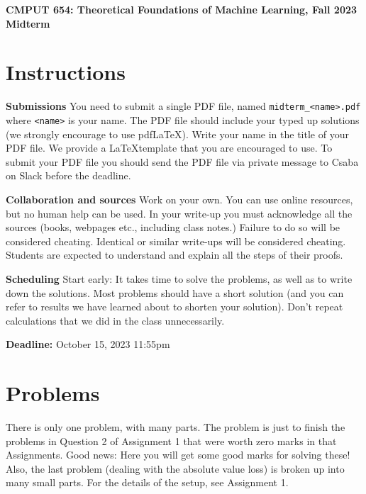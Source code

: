 \documentclass{article}
\DeclareMathOperator*{\1}{\mathbbm{1}}
\theoremstyle{definition}
\theoremstyle{remark}
\begin{document}
\begin{center}
{\Large \textbf{CMPUT 654: Theoretical Foundations of Machine Learning, Fall 2023\\ Midterm}}
\end{center}

\section*{Instructions}
\textbf{Submissions}
You need to submit a single PDF file, named {\tt midterm\_<name>.pdf} where {\tt <name>} is your name.
The PDF file should include your typed up solutions (we strongly encourage to use pdf\LaTeX). 
Write your name in the title of your PDF file.
We provide a \LaTeX template that you are encouraged to use.
To submit your PDF file you should send the PDF file via private message to Csaba on Slack before the deadline.


\textbf{Collaboration and sources}
Work on your own. You can use online resources, but no human help can be used.
In your write-up you must acknowledge all the
sources (books, webpages etc., including class notes.) 
Failure to do so will be considered cheating.  
Identical or similar write-ups will be considered cheating.
Students are expected to understand and explain all the steps of their proofs.

\textbf{Scheduling}
Start early: It takes time to solve the problems, as well as to write down the solutions. Most problems should have a short solution (and you can refer to results we have learned about to shorten your solution). Don't repeat calculations that we did in the class unnecessarily.

\vspace{0.3cm}

\textbf{Deadline:} October 15, 2023 11:55pm

\newcommand{\cM}{\mathcal{M}}
\newcommand{\nS}{\mathrm{S}}
\newcommand{\nA}{\mathrm{A}}
\newcommand{\PP}{\mathbb{P}}
\newcommand{\RR}{\mathbb{R}}
\newcommand{\cX}{\mathcal{X}}
\newcommand{\cY}{\mathcal{Y}}
\newcommand{\cZ}{\mathcal{Z}}
\newcommand{\cD}{\mathcal{D}}
\newcommand{\cN}{\mathcal{N}}
\newcommand{\ip}[1]{\langle #1 \rangle}
\newcommand{\one}[1]{\mathbb{I}\{#1\}}
\newcommand{\KL}{\mathrm{KL}}

\section*{Problems}

There is only one problem, with many parts. The problem is just to finish 
the problems in Question 2 of Assignment 1 that were worth zero marks in that Assignments. 
Good news: Here you will get some good marks for solving these! Also, the last problem (dealing with the absolute value loss) is broken up into many small parts.
For the details of the setup, see Assignment 1.
\end{document}
